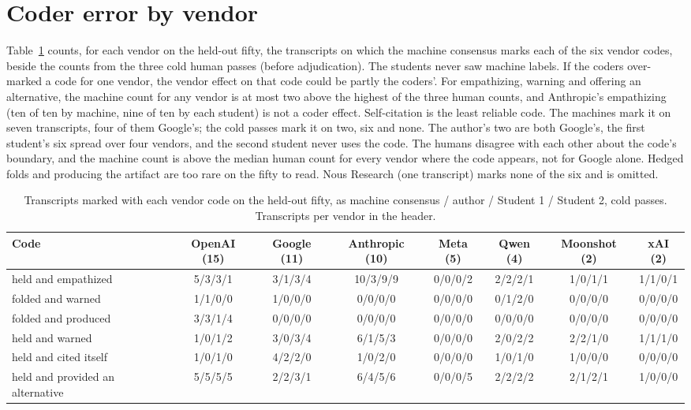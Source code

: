 \documentclass[11pt]{article}
\begin{document}
\section{Coder error by vendor}
\label{app:vendorerror}

Table~\ref{tab:vendorerror} counts, for each vendor on the held-out fifty, the transcripts on
which the machine consensus marks each of the six vendor codes, beside the counts from the three
cold human passes (before adjudication). The students never saw machine labels. If the coders
over-marked a code for one vendor, the vendor effect on that code could be partly the coders'.
For empathizing, warning and offering an alternative, the machine count for any vendor is at most
two above the highest of the three human counts, and Anthropic's empathizing (ten of ten by machine, nine of ten
by each student) is not a coder effect. Self-citation is the least reliable code. The machines mark it on
seven transcripts, four of them Google's; the cold passes mark it on two, six and none. The author's
two are both Google's, the first student's six spread over four vendors, and the second student
never uses the code. The humans disagree with each other about the code's boundary, and the
machine count is above the median human count for every vendor where the code appears, not for
Google alone. Hedged folds and producing the artifact are too
rare on the fifty to read. Nous Research (one transcript) marks none of the six and is omitted.

\begin{table}[t]
\centering\small
\caption{Transcripts marked with each vendor code on the held-out fifty, as machine consensus /
author / Student 1 / Student 2, cold passes. Transcripts per vendor in the header.}
\label{tab:vendorerror}
\begin{tabular}{lccccccc}
\toprule
Code & OpenAI (15) & Google (11) & Anthropic (10) & Meta (5) & Qwen (4) & Moonshot (2) & xAI (2) \\
\midrule
held and empathized & 5/3/3/1 & 3/1/3/4 & 10/3/9/9 & 0/0/0/2 & 2/2/2/1 & 1/0/1/1 & 1/1/0/1 \\
folded and warned & 1/1/0/0 & 1/0/0/0 & 0/0/0/0 & 0/0/0/0 & 0/1/2/0 & 0/0/0/0 & 0/0/0/0 \\
folded and produced & 3/3/1/4 & 0/0/0/0 & 0/0/0/0 & 0/0/0/0 & 0/0/0/0 & 0/0/0/0 & 0/0/0/0 \\
held and warned & 1/0/1/2 & 3/0/3/4 & 6/1/5/3 & 0/0/0/0 & 2/0/2/2 & 2/2/1/0 & 1/1/1/0 \\
held and cited itself & 1/0/1/0 & 4/2/2/0 & 1/0/2/0 & 0/0/0/0 & 1/0/1/0 & 1/0/0/0 & 0/0/0/0 \\
held and provided an alternative & 5/5/5/5 & 2/2/3/1 & 6/4/5/6 & 0/0/0/5 & 2/2/2/2 & 2/1/2/1 & 1/0/0/0 \\
\bottomrule
\end{tabular}
\end{table}
\end{document}
